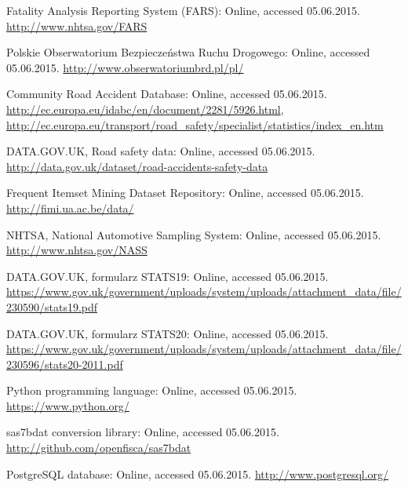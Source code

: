 \documentclass[12pt]{aghdpl}
\begin{document}
\begin{thebibliography}{99}

Fatality Analysis Reporting System (FARS): Online, accessed 05.06.2015. \href{http://www.nhtsa.gov/FARS}{http://www.nhtsa.gov/FARS}

Polskie Obserwatorium Bezpieczeństwa Ruchu Drogowego: Online, accessed 05.06.2015. \href{http://www.obserwatoriumbrd.pl/pl/}{http://www.obserwatoriumbrd.pl/pl/}

Community Road Accident Database: Online, accessed 05.06.2015. \href{http://ec.europa.eu/idabc/en/document/2281/5926.html}{http://ec.europa.eu/idabc/en/document/2281/5926.html}, \\ \href{http://ec.europa.eu/transport/road_safety/specialist/statistics/index_en.htm}{http://ec.europa.eu/transport/road\_safety/specialist/statistics/index\_en.htm}

DATA.GOV.UK, Road safety data: Online, accessed 05.06.2015. \href{http://data.gov.uk/dataset/road-accidents-safety-data}{http://data.gov.uk/dataset/road-accidents-safety-data}

Frequent Itemset Mining Dataset Repository: Online, accessed 05.06.2015. \href{http://fimi.ua.ac.be/data/}{http://fimi.ua.ac.be/data/}

NHTSA, National Automotive Sampling System: Online, accessed 05.06.2015. \href{http://www.nhtsa.gov/NASS}{http://www.nhtsa.gov/NASS}

DATA.GOV.UK, formularz STATS19: Online, accessed 05.06.2015. \href{https://www.gov.uk/government/uploads/system/uploads/attachment_data/file/230590/stats19.pdf}{https://www.gov.uk/government/uploads/system/uploads/attachment\_data/file/230590/stats19.pdf}


DATA.GOV.UK, formularz STATS20: Online, accessed 05.06.2015. \href{https://www.gov.uk/government/uploads/system/uploads/attachment_data/file/230596/stats20-2011.pdf}{https://www.gov.uk/government/uploads/system/uploads/attachment\_data/file/230596/stats20-2011.pdf}

Python programming language: Online, accessed 05.06.2015. \href{https://www.python.org/}{https://www.python.org/}

sas7bdat conversion library: Online, accessed 05.06.2015. \href{http://github.com/openfisca/sas7bdat}{http://github.com/openfisca/sas7bdat}

PostgreSQL database: Online, accessed 05.06.2015. \href{http://www.postgresql.org/}{http://www.postgresql.org/}


\end{thebibliography}
\end{document}
